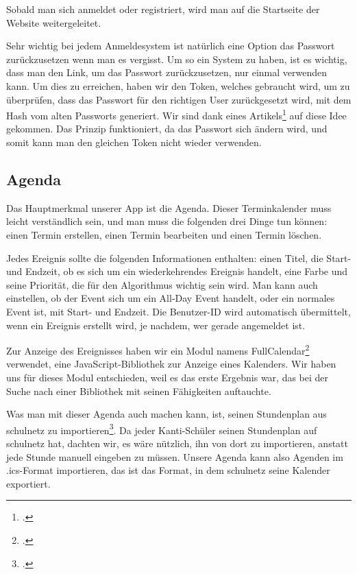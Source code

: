 \documentclass[12pt,a4paper]{report}
\begin{document}
Sobald man sich anmeldet oder registriert, wird man auf die Startseite der Website weitergeleitet.

Sehr wichtig bei jedem Anmeldesystem ist natürlich eine Option das Passwort zurückzusetzen wenn man es vergisst. Um so ein System zu haben, ist es wichtig, dass man den Link, um das Passwort zurückzusetzen, nur einmal verwenden kann. Um dies zu erreichen, haben wir den Token, welches gebraucht wird, um zu überprüfen, dass das Passwort für den richtigen User zurückgesetzt wird, mit dem Hash vom alten Passworts generiert. Wir sind dank eines Artikels\footcite{password_reset} auf diese Idee gekommen. Das Prinzip funktioniert, da das Passwort sich ändern wird, und somit kann man den gleichen Token nicht wieder verwenden.


\subsection{Agenda}
Das Hauptmerkmal unserer App ist die Agenda. Dieser Terminkalender muss leicht verständlich sein, und man muss die folgenden drei Dinge tun können: einen Termin erstellen, einen Termin bearbeiten und einen Termin löschen.

Jedes Ereignis sollte die folgenden Informationen enthalten: einen Titel, die Start- und Endzeit, ob es sich um ein wiederkehrendes Ereignis handelt, eine Farbe und seine Priorität, die für den Algorithmus wichtig sein wird. Man kann auch einstellen, ob der Event sich um ein All-Day Event handelt, oder ein normales Event ist, mit Start- und Endzeit. Die Benutzer-ID wird automatisch übermittelt, wenn ein Ereignis erstellt wird, je nachdem, wer gerade angemeldet ist.

Zur Anzeige des Ereignisses haben wir ein Modul namens FullCalendar\footcite{full_calendar} verwendet, eine JavaScript-Bibliothek zur Anzeige eines Kalenders. Wir haben uns für dieses Modul entschieden, weil es das erste Ergebnis war, das bei der Suche nach einer Bibliothek mit seinen Fähigkeiten auftauchte. 

Was man mit dieser Agenda auch machen kann, ist, seinen Stundenplan aus schulnetz zu importieren\footcite{icalendar}. Da jeder Kanti-Schüler seinen Stundenplan auf schulnetz hat, dachten wir, es wäre nützlich, ihn von dort zu importieren, anstatt jede Stunde manuell eingeben zu müssen. Unsere Agenda kann also Agenden im .ics-Format importieren, das ist das Format, in dem schulnetz seine Kalender exportiert.
\end{document}
